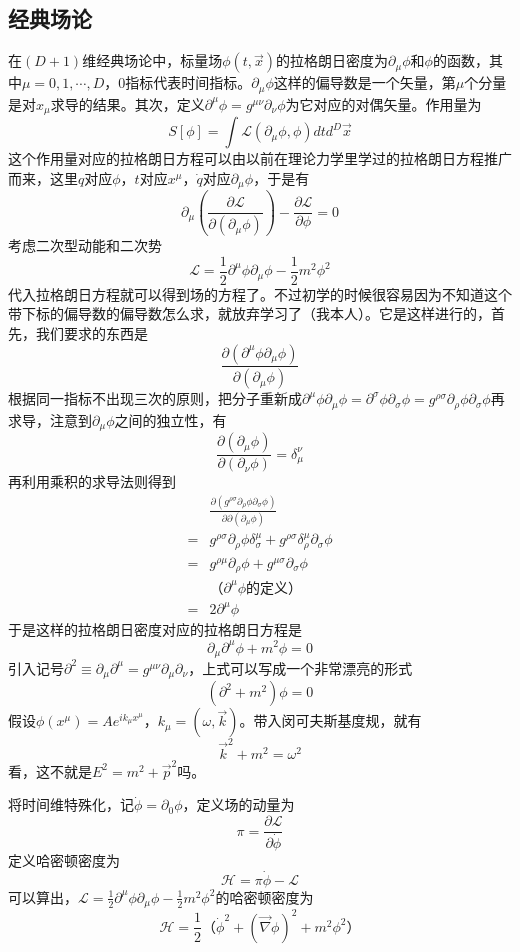 \documentclass[a4paper,11pt]{ctexart}
\newcommand{\beq}{\begin{equation}}
\newcommand{\eeq}{\end{equation}}
\newcommand{\bea}{\begin{equation}\begin{aligned}}
\newcommand{\eea}{\end{aligned}\end{equation}}
\newcommand{\lagden}{\mathcal{L}}
\newcommand{\lag}{\mathcal{L}}
\newcommand{\ham}{\mathcal{H}}
\begin{document}
\subsection{经典场论}
在$(D+1)$维经典场论中，标量场$\phi(t,\vec{x})$的拉格朗日密度为$\partial_\mu \phi$和$\phi$的函数，其中$\mu = 0,1,\cdots,D$，0指标代表时间指标。$\partial_\mu \phi$这样的偏导数是一个矢量，第$\mu$个分量是对$x_\mu$求导的结果。其次，定义$\partial^\mu \phi = g^{\mu \nu} \partial_\nu \phi$为它对应的对偶矢量。作用量为
\beq
S[\phi] = \int  \lagden(\partial_\mu \phi,\phi)dt d^D\vec{x}
\eeq
这个作用量对应的拉格朗日方程可以由以前在理论力学里学过的拉格朗日方程推广而来，这里$q$对应$\phi$，$t$对应$x^\mu$，$\dot{q}$对应$\partial_\mu \phi$，于是有
\beq
\partial_\mu (\frac{\partial \lagden}{\partial (\partial_\mu \phi)}) - \frac{\partial \lagden}{\partial \phi} = 0
\eeq
考虑二次型动能和二次势
\beq
\lagden = \frac{1}{2} \partial^\mu \phi \partial_\mu \phi - \frac{1}{2}m^2 \phi^2
\eeq
代入拉格朗日方程就可以得到场的方程了。不过初学的时候很容易因为不知道这个带下标的偏导数的偏导数怎么求，就放弃学习了（我本人）。它是这样进行的，首先，我们要求的东西是
\beq
\frac{\partial (\partial^\mu \phi \partial_\mu \phi)}{\partial (\partial_\mu \phi)}
\eeq
根据同一指标不出现三次的原则，把分子重新成$\partial^\mu \phi \partial_\mu \phi = \partial^\sigma \phi \partial_\sigma \phi = g^{\rho \sigma} \partial_\rho \phi \partial_\sigma \phi$再求导，注意到$\partial_\mu \phi$之间的独立性，有
\beq
\frac{\partial (\partial_\mu \phi )}{\partial (\partial_\nu \phi )} = \delta^\nu_\mu
\eeq
再利用乘积的求导法则得到
\bea
&\frac{\partial (g^{\rho \sigma} \partial_\rho \phi \partial_\sigma \phi)}{\partial \partial(\partial_\mu \phi)} \\
= &g^{\rho \sigma} \partial_\rho \phi \delta^\mu_\sigma + g^{\rho \sigma} \delta^\mu_\rho \partial_\sigma \phi \\
= &g^{\rho \mu}\partial_\rho \phi+ g^{\mu \sigma}\partial_\sigma \phi \\
  &\text{（$\partial^\mu \phi$的定义）} \\
= & 2\partial^\mu \phi
\eea
于是这样的拉格朗日密度对应的拉格朗日方程是
\beq
\partial_\mu \partial^\mu \phi + m^2 \phi = 0
\eeq
引入记号$\partial^2 \equiv \partial_\mu \partial^\mu = g^{\mu \nu} \partial_\mu \partial_\nu$，上式可以写成一个非常漂亮的形式
\beq
(\partial^2 + m^2) \phi = 0
\eeq
假设$\phi(x^\mu) = Ae^{i k_\mu x^\mu}$，$k_\mu = (\omega,\vec{k})$。带入闵可夫斯基度规，就有
\beq
\vec{k}^2 + m^2 = \omega^2
\eeq
看，这不就是$E^2 = m^2 + \vec{p}^2$吗。
\par
将时间维特殊化，记$\dot{\phi} = \partial_0 \phi$，定义场的动量为
\beq
\pi = \frac{\partial \lag}{\partial \dot{\phi}}
\eeq
定义哈密顿密度为
\beq
\ham = \pi \dot{\phi} - \lag
\eeq
可以算出，$\lag = \frac{1}{2} \partial^\mu \phi \partial_\mu \phi - \frac{1}{2}m^2 \phi^2$的哈密顿密度为
\beq
\ham = \frac{1}{2}（\dot{\phi}^2  + (\vec{\nabla} \phi)^2 + m^2\phi^2）
\eeq
\end{document}
